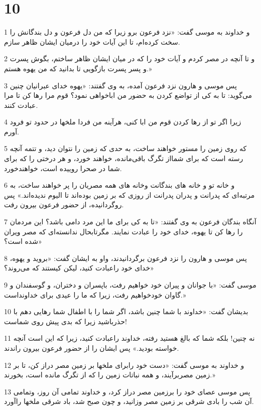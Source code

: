 \chapter{10}

\par 1 و خداوند به موسی گفت: «نزد فرعون برو زیرا که من دل فرعون و دل بندگانش را سخت کرده‌ام، تا این آیات خود را درمیان ایشان ظاهر سازم.
\par 2 و تا آنچه در مصر کردم و آیات خود را که در میان ایشان ظاهر ساختم، بگوش پسرت و پسر پسرت بازگویی تا بدانید که من یهوه هستم.»
\par 3 پس موسی و هارون نزد فرعون آمده، به وی گفتند: «یهوه خدای عبرانیان چنین می‌گوید: تا به کی از تواضع کردن به حضور من اباخواهی نمود؟ قوم مرا رها کن تا مرا عبادت کنند.
\par 4 زیرا اگر تو از رها کردن قوم من ابا کنی، هرآینه من فردا ملخها در حدود تو فرود آورم.
\par 5 که روی زمین را مستور خواهند ساخت، به حدی که زمین را نتوان دید، و تتمه آنچه رسته است که برای شمااز تگرگ باقی‌مانده، خواهند خورد، و هر درختی را که برای شما در صحرا روییده است، خواهندخورد.
\par 6 و خانه تو و خانه های بندگانت وخانه های همه مصریان را پر خواهند ساخت، به مرتبه‌ای که پدرانت و پدران پدرانت از روزی که بر زمین بوده‌اند تا الیوم ندیده‌اند.» پس روگردانیده، از حضور فرعون بیرون رفت.
\par 7 آنگاه بندگان فرعون به وی گفتند: «تا به کی برای ما این مرد دامی باشد؟ این مردمان را رها کن تا یهوه، خدای خود را عبادت نمایند. مگرتابحال ندانسته‌ای که مصر ویران شده است؟»
\par 8 پس موسی و هارون را نزد فرعون برگردانیدند، واو به ایشان گفت: «بروید و یهوه، خدای خود راعبادت کنید، لیکن کیستند که می‌روند؟»
\par 9 موسی گفت: «با جوانان و پیران خود خواهیم رفت، باپسران و دختران، و گوسفندان و گاوان خودخواهیم رفت، زیرا که ما را عیدی برای خداونداست.» 
\par 10 بدیشان گفت: «خداوند با شما چنین باشد، اگر شما را با اطفال شما رهایی دهم با حذرباشید زیرا که بدی پیش روی شماست!
\par 11 نه چنین! بلکه شما که بالغ هستید رفته، خداوند راعبادت کنید، زیرا که این است آنچه خواسته بودید.» پس ایشان را از حضور فرعون بیرون راندند.
\par 12 و خداوند به موسی گفت: «دست خود رابرای ملخها بر زمین مصر دراز کن، تا بر زمین مصربرآیند، و همه نباتات زمین را که از تگرگ مانده است، بخورند.»
\par 13 پس موسی عصای خود را برزمین مصر دراز کرد، و خداوند تمامی آن روز، وتمامی آن شب را بادی شرقی بر زمین مصر وزانید، و چون صبح شد، باد شرقی ملخها راآورد.
